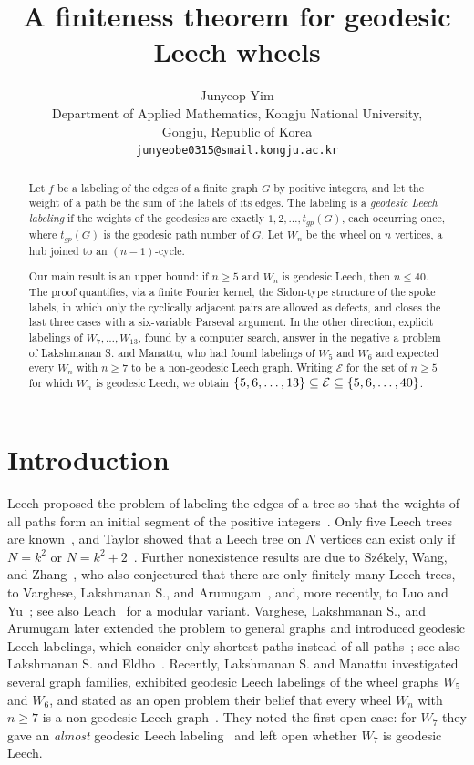 \documentclass[11pt]{article}
\title{A finiteness theorem for geodesic Leech wheels}
\author{Junyeop Yim\\
\small Department of Applied Mathematics, Kongju National University,\\
\small Gongju, Republic of Korea\\
\small \texttt{junyeobe0315@smail.kongju.ac.kr}}
\date{}
\theoremstyle{definition}
\theoremstyle{remark}
\numberwithin{equation}{section}
\newcommand{\calE}{\mathcal{E}}
\DeclarePairedDelimiter{\set}{\{}{\}}
\begin{document}
\maketitle

\begin{abstract}
Let $f$ be a labeling of the edges of a finite graph $G$ by positive integers, and let the weight of a path be the sum of the labels of its edges. The labeling is a \emph{geodesic Leech labeling} if the weights of the geodesics are exactly $1,2,\ldots,t_{gp}(G)$, each occurring once, where $t_{gp}(G)$ is the geodesic path number of $G$. Let $W_n$ be the wheel on $n$ vertices, a hub joined to an $(n-1)$-cycle.

Our main result is an upper bound: if $n\ge5$ and $W_n$ is geodesic Leech, then $n\le40$. The proof quantifies, via a finite Fourier kernel, the Sidon-type structure of the spoke labels, in which only the cyclically adjacent pairs are allowed as defects, and closes the last three cases with a six-variable Parseval argument. In the other direction, explicit labelings of $W_7,\ldots,W_{13}$, found by a computer search, answer in the negative a problem of Lakshmanan S. and Manattu, who had found labelings of $W_5$ and $W_6$ and expected every $W_n$ with $n\ge7$ to be a non-geodesic Leech graph. Writing $\calE$ for the set of $n\ge5$ for which $W_n$ is geodesic Leech, we obtain $\set{5,6,\ldots,13}\subseteq\calE\subseteq\set{5,6,\ldots,40}$.
\end{abstract}

\section{Introduction}\label{sec:intro}

Leech proposed the problem of labeling the edges of a tree so that the weights of all paths form an initial segment of the positive integers~\cite{Leech1975}. Only five Leech trees are known~\cite{OzenWangYalman2016}, and Taylor showed that a Leech tree on $N$ vertices can exist only if $N=k^2$ or $N=k^2+2$~\cite{Taylor1977}. Further nonexistence results are due to Sz\'ekely, Wang, and Zhang~\cite{SzekelyWangZhang2005}, who also conjectured that there are only finitely many Leech trees, to Varghese, Lakshmanan S., and Arumugam~\cite{VargheseEtAl2020}, and, more recently, to Luo and Yu~\cite{LuoYu2024}; see also Leach~\cite{Leach2014} for a modular variant. Varghese, Lakshmanan S., and Arumugam later extended the problem to general graphs and introduced geodesic Leech labelings, which consider only shortest paths instead of all paths~\cite{VargheseEtAl2022,VargheseLeechGraphs2024,VargheseEtAl2024}; see also Lakshmanan S. and Eldho~\cite{LakshmananEldho2024}. Recently, Lakshmanan S. and Manattu investigated several graph families, exhibited geodesic Leech labelings of the wheel graphs $W_5$ and $W_6$, and stated as an open problem their belief that every wheel $W_n$ with $n\ge7$ is a non-geodesic Leech graph~\cite{LakshmananManattu2025}. They noted the first open case: for $W_7$ they gave an \emph{almost} geodesic Leech labeling~\cite[Figure~4]{LakshmananManattu2025} and left open whether $W_7$ is geodesic Leech.
\end{document}
